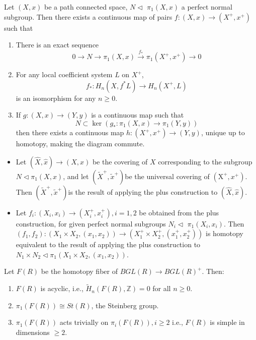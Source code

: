 \begin{theo}[Quillen]
Let $(X, x)$ be a path connected space, $N \triangleleft$ $\pi_1(X, x)$ a perfect normal subgroup. Then there exists a continuous map of pairs $f:(X, x) \longrightarrow\left(X^{+}, x^{+}\right)$such that
\begin{enumerate}
    \item There is an exact sequence
    $$
    0 \longrightarrow N \longrightarrow \pi_1(X, x) \xrightarrow{f_*} \pi_1\left(X^{+}, x^{+}\right) \longrightarrow 0
    $$
    \item For any local coefficient system $L$ on $X^{+}$,
    $$
    f_*: H_n\left(X, f^* L\right) \longrightarrow H_n\left(X^{+}, L\right)
    $$
    is an isomorphism for any $n \geq 0$.
    \item If $g:(X, x) \longrightarrow(Y, y)$ is a continuous map such that
    $$
    N \subset \operatorname{ker}\left(g_*: \pi_1(X, x) \longrightarrow \pi_1(Y, y)\right)
    $$
    then there exists a continuous map $h:\left(X^{+}, x^{+}\right) \longrightarrow(Y, y)$, unique up to homotopy, making the diagram commute.
\end{enumerate}

\end{theo}

\begin{prop}
    \begin{itemize}
        \item Let $(\hat{X}, \hat{x}) \longrightarrow(X, x)$ be the covering of $X$ corresponding to the subgroup $N \triangleleft \pi_1(X, x)$, and let $\left(\tilde{X}^{+}, \tilde{x}^{+}\right)$be the universal covering of $\left(\mathrm{X}^{+}, x^{+}\right)$. Then $\left(\tilde{X}^{+}, \tilde{x}^{+}\right)$is the result of applying the plus construction to $(\hat{X}, \hat{x})$.
        \item Let $f_i:\left(X_i, x_i\right) \longrightarrow\left(X_i^{+}, x_i^{+}\right), i=1,2$ be obtained from the plus construction, for given perfect normal subgroups $N_i \triangleleft$ $\pi_1\left(X_i, x_i\right)$. Then $\left(f_1, f_2\right):\left(X_1 \times X_2,\left(x_1, x_2\right)\right) \longrightarrow\left(X_1^{+} \times X_2^{+},\left(x_1^{+}, x_2^{+}\right)\right)$ is homotopy equivalent to the result of applying the plus construction to $N_1 \times N_2 \triangleleft \pi_1\left(X_1 \times X_2,\left(x_1, x_2\right)\right)$.
    \end{itemize}
\end{prop}

\begin{prop}
    Let $F(R)$ be the homotopy fiber of $B G L(R) \longrightarrow B G L(R)^{+}$. Then:
    \begin{enumerate}
        \item $F(R)$ is acyclic, i.e., $\tilde{H}_n(F(R), \mathbb{Z})=0$ for all $n \geq 0$.
        \item $\pi_1(F(R)) \cong S t(R)$, the Steinberg group.
        \item $\pi_1(F(R))$ acts trivially on $\pi_i(F(R)), i \geq 2$ i.e., $F(R)$ is simple in dimensions $\geq 2$.   
    \end{enumerate} 
\end{prop}

